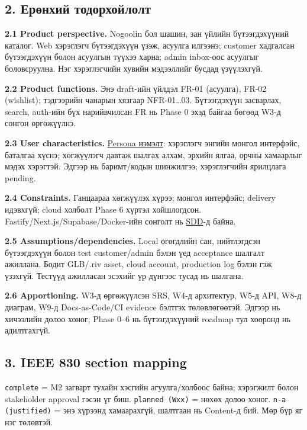 \subsection{2. Ерөнхий
тодорхойлолт}\label{doc3-ux435ux440ux4e9ux43dux445ux438ux439-ux442ux43eux434ux43eux440ux445ux43eux439ux43bux43eux43bux442}

\textbf{2.1 Product perspective.} Nogoolin бол шашин, зан үйлийн
бүтээгдэхүүний каталог. Web хэрэглэгч бүтээгдэхүүн үзэж, асуулга
илгээнэ; customer хадгалсан бүтээгдэхүүн болон асуулгын түүхээ харна;
admin inbox-оос асуулгыг боловсруулна. Нэг хэрэглэгчийн хувийн
мэдээллийг бусдад үзүүлэхгүй.

\textbf{2.2 Product functions.} Энэ draft-ийн үйлдэл FR-01 (асуулга),
FR-02 (wishlist); тэдгээрийн чанарын хязгаар NFR-01\ldots03.
Бүтээгдэхүүн засварлах, search, auth-ийн бүх нарийвчилсан FR нь Phase 0
эхэд байгаа бөгөөд W3-д сонгон өргөжүүлнэ.

\textbf{2.3 User characteristics.}
\href{wiki/persona-and-pivot.md}{Persona нэмэлт}: хэрэглэгч энгийн
монгол интерфэйс, баталгаа хүснэ; хөгжүүлэгч давтаж шалгах алхам, эрхийн
ялгаа, орчны хамаарлыг мэдэх хэрэгтэй. Эдгээр нь баримт/кодын шинжилгээ;
хэрэглэгчийн ярилцлага pending.

\textbf{2.4 Constraints.} Ганцаараа хөгжүүлэх хүрээ; монгол интерфэйс;
delivery идэвхгүй; cloud холболт Phase 6 хүртэл хойшлогдсон.
Fastify/Next.js/Supabase/Docker-ийн сонголт нь
\href{../../architecture/sdd-template.md}{SDD}-д байна.

\textbf{2.5 Assumptions/dependencies.} Local өгөгдлийн сан, нийтлэгдсэн
бүтээгдэхүүн болон test customer/admin бэлэн үед acceptance шалгалт
ажиллана. Бодит GLB/.riv asset, cloud account, production log бэлэн гэж
үзэхгүй. Тестүүд ажилласан эсэхийг үр дүнгээс тусад нь шалгана.

\textbf{2.6 Apportioning.} W3-д өргөжүүлсэн SRS, W4-д архитектур, W5-д
API, W8-д диаграм, W9-д Docs-as-Code/CI evidence бэлтгэх төлөвлөгөөтэй.
Эдгээр нь хичээлийн долоо хоног; Phase 0--6 нь бүтээгдэхүүний roadmap
тул хооронд нь адилтгахгүй.

\subsection{3. IEEE 830 section
mapping}\label{doc3-ieee-830-section-mapping}

\nolinkurl{complete} = M2 загварт тухайн хэсгийн агуулга/холбоос байна;
хэрэгжилт болон stakeholder approval гэсэн үг биш.
\nolinkurl{planned (Wxx)} = нөхөх долоо хоног.
\nolinkurl{n-a (justified)} = энэ хүрээнд хамаарахгүй, шалтгаан нь
Content-д бий. Мөр бүр яг нэг төлөвтэй.


